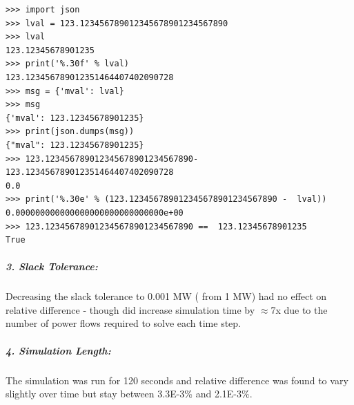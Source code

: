 \documentclass[12pt]{article}
\begin{document}
\begin{lstlisting}
>>> import json
>>> lval = 123.123456789012345678901234567890
>>> lval
123.12345678901235
>>> print('%.30f' % lval)
123.123456789012351464407402090728
>>> msg = {'mval': lval}
>>> msg
{'mval': 123.12345678901235}
>>> print(json.dumps(msg))
{"mval": 123.12345678901235}
>>> 123.123456789012345678901234567890-123.123456789012351464407402090728
0.0
>>> print('%.30e' % (123.123456789012345678901234567890 -  lval))
0.000000000000000000000000000000e+00
>>> 123.123456789012345678901234567890 ==  123.12345678901235
True
\end{lstlisting}

\subparagraph{3. Slack Tolerance:}
Decreasing the slack tolerance to 0.001 MW ( from 1 MW) had no effect on relative difference - though did increase simulation time by $\approx$7x due to the number of power flows required to solve each time step.

\subparagraph{4. Simulation Length:}
The simulation was run for 120 seconds and relative difference was found to vary slightly over time but stay between 3.3E-3\% and 2.1E-3\%.
\end{document}
